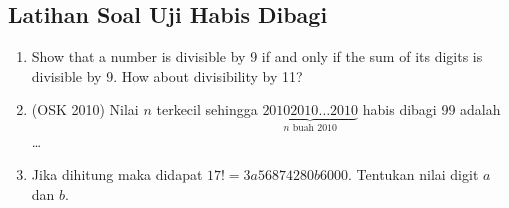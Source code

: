 \subsection{Latihan Soal Uji Habis Dibagi}
\begin{enumerate}
    \item Show that a number is divisible by 9 if and only if the sum of its digits is divisible by 9. How about divisibility by 11?
    
    \item (OSK 2010) Nilai $n$ terkecil sehingga $\underbrace{20102010\dots2010}_\text{$n$ buah 2010}$ habis dibagi 99 adalah \dots
    
    \item Jika dihitung maka didapat $17! = 3a56874280b6000$. Tentukan nilai digit $a$ dan $b$.
\end{enumerate}